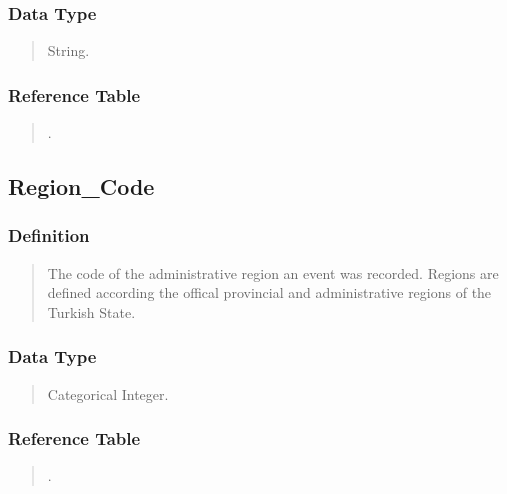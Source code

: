 \documentclass[letterpaper,10pt,english]{sphinxmanual}
\begin{document}
\subsubsection{Data Type}
\label{\detokenize{database_schema:id23}}\begin{quote}

\sphinxAtStartPar
String.
\end{quote}


\subsubsection{Reference Table}
\label{\detokenize{database_schema:id24}}\begin{quote}

\sphinxAtStartPar
{\hyperref[\detokenize{database_schema:region-table}]{}}.
\end{quote}


\subsection{Region\_Code}
\label{\detokenize{database_schema:region-code}}

\subsubsection{Definition}
\label{\detokenize{database_schema:id25}}\begin{quote}

\sphinxAtStartPar
The code of the administrative region an event was recorded.  Regions are defined according the offical provincial and administrative regions of the Turkish State.
\end{quote}


\subsubsection{Data Type}
\label{\detokenize{database_schema:id26}}\begin{quote}

\sphinxAtStartPar
Categorical Integer.
\end{quote}


\subsubsection{Reference Table}
\label{\detokenize{database_schema:id27}}\begin{quote}

\sphinxAtStartPar
{\hyperref[\detokenize{database_schema:region-table}]{}}.
\end{quote}
\end{document}

